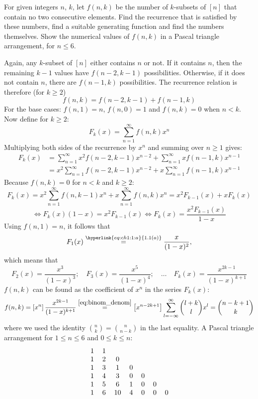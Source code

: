 \begin{exercise}
    \label{ex:1-12}
    For given integers $n$, $k$, let $f(n, k)$ be the number of $k$-subsets of $[n]$ that contain no two consecutive elements. Find the recurrence that is satisfied by these numbers, find a suitable generating function and find the numbers themselves. Show the numerical values of $f(n, k)$ in a Pascal triangle arrangement, for $n\leq 6$.
\end{exercise}
\begin{solution}
    Again, any $k$-subset of $[n]$ either contains $n$ or not. If it contains $n$, then the remaining $k-1$ values have $f(n-2, k-1)$ possibilities. Otherwise, if it does not contain $n$, there are $f(n-1, k)$ possibilities. The recurrence relation is therefore (for $k\geq 2$)
    \[
        f(n, k) = f(n-2, k-1) + f(n-1, k)
    \]
    For the base cases: $f(n, 1) = n$, $f(n, 0) = 1$ and $f(n,k)= 0$ when $n < k$. Now define for $k\geq 2$:
    \[
        F_k(x) = \sum_{n=1}^\infty f(n,k)x^n
    \]
    Multiplying both sides of the recurrence by $x^n$ and summing over $n \geq 1$ gives:
    \begin{align*}
        F_k(x) &= \sum_{n=1}^\infty x^2f(n-2, k-1)x^{n-2} + \sum_{n=1}^\infty xf(n-1,k)x^{n-1} \\
        &= x^2\sum_{n=1}^\infty f(n-2, k-1)x^{n-2} + x\sum_{n=1}^\infty f(n-1, k)x^{n-1}
    \end{align*}
    Because $f(n, k) = 0$ for $n < k$ and $k\geq 2$:
    \[
        F_k(x) = x^2\sum_{n=1}^\infty f(n, k-1)x^n + x\sum_{n=1}^\infty f(n, k)x^n = x^2F_{k-1}(x) + x F_k(x)
    \]
    \[ \Longleftrightarrow
        F_k(x) (1-x) = x^2F_{k-1}(x) \Longleftrightarrow F_k(x) = \frac{x^2F_{k-1}(x)}{1-x}
    \]
    Using $f(n,1) = n$, it follows that 
    \[
        F_1(x) \estep{\hyperlink{eq:ch1:1:a}{1.1(a)}}  \frac{x}{(1-x)^2},
    \]
    which means that
    \[
        F_2(x) = \frac{x^{3}}{(1-x)^3}; \quad F_3(x) = \frac{x^5}{(1-x)^4}; \quad \ldots \quad F_k(x) = \frac{x^{2k - 1}}{(1-x)^{k+1}}
    \]
    $f(n, k)$ can be found as the coefficient of $x^n$ in the series $F_k(x)$:
    \[
        f(n,k) = \coeff{x^n} \frac{x^{2k-1}}{(1-x)^{k+1}} \estep{\eqref{eq:binom_denom}} \coeff{x^{n-2k+1}} \infsum[l] \binom{l+k}{l}x^l = \binom{n-k+1}{k}
    \]  
    where we used the identity $\binom{n}{k} = \binom{n}{n-k}$ in the last equality. A Pascal triangle arrangement for $1 \leq n\leq 6$ and $0 \leq k \leq n$:
    \[
    \begin{tabular}{cccccccc}
        1 & 1 \\
        1 & 2 & 0 \\
        1 & 3 & 1 & 0 \\
        1 & 4 & 3 & 0 & 0 \\
        1 & 5 & 6 & 1 & 0 & 0 \\
        1 & 6 & 10 & 4 & 0 & 0 & 0
    \end{tabular}
    \]
\end{solution}

